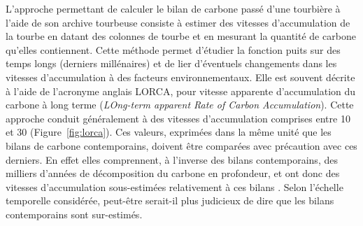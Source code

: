 L'approche permettant de calculer le bilan de carbone passé d'une tourbière à l'aide de son archive tourbeuse consiste à estimer des vitesses d'accumulation de la tourbe en datant des colonnes de tourbe et en mesurant la quantité de carbone qu'elles contiennent.
Cette méthode permet d'étudier la fonction puits sur des temps longs (derniers millénaires) et de lier d'éventuels changements dans les vitesses d'accumulation à des facteurs environnementaux.
Elle est souvent décrite à l'aide de l'acronyme anglais LORCA, pour vitesse apparente d'accumulation du carbone à long terme (\textit{LOng-term apparent Rate of Carbon Accumulation}).
Cette approche conduit généralement à des vitesses d'accumulation comprises entre 10 et \SI{30}{\gcma} (Figure~\ref{fig:lorca}).
Ces valeurs, exprimées dans la même unité que les bilans de carbone contemporains, doivent être comparées avec précaution avec ces derniers.
En effet elles comprennent, à l'inverse des bilans contemporains, des milliers d'années de décomposition du carbone en profondeur, et ont donc des vitesses d'accumulation sous-estimées relativement à ces bilans \citep{yu2009}.
Selon l'échelle temporelle considérée, peut-être serait-il plus judicieux de dire que les bilans contemporains sont sur-estimés.

